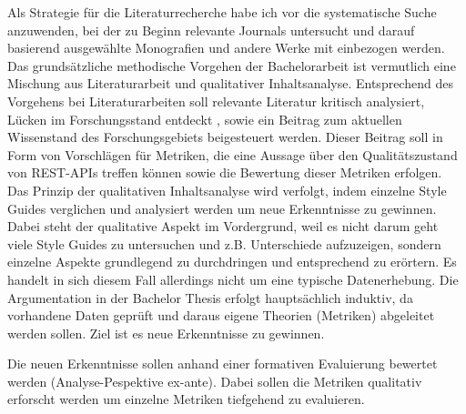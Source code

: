 \documentclass[../../expose]{subfiles}
\begin{document}
Als Strategie für die Literaturrecherche habe ich vor die systematische Suche anzuwenden, bei der zu Beginn relevante Journals untersucht und darauf basierend ausgewählte Monografien und andere Werke mit einbezogen werden.\newline
%
Das grundsätzliche methodische Vorgehen der Bachelorarbeit ist vermutlich eine Mischung aus Literaturarbeit und qualitativer Inhaltsanalyse. Entsprechend des Vorgehens bei Literaturarbeiten soll relevante Literatur kritisch analysiert, Lücken im Forschungsstand entdeckt , sowie ein Beitrag zum aktuellen Wissenstand des Forschungsgebiets beigesteuert werden. Dieser Beitrag soll in Form von Vorschlägen für Metriken, die eine Aussage über den Qualitätszustand von REST-APIs treffen können sowie die Bewertung dieser Metriken erfolgen. Das Prinzip der qualitativen Inhaltsanalyse wird verfolgt, indem einzelne Style Guides verglichen und analysiert werden um neue Erkenntnisse zu gewinnen. Dabei steht der qualitative Aspekt im Vordergrund, weil es nicht darum geht viele Style Guides zu untersuchen und z.B. Unterschiede aufzuzeigen, sondern einzelne Aspekte grundlegend zu durchdringen und entsprechend zu erörtern. Es handelt in sich diesem Fall allerdings nicht um eine typische Datenerhebung.\newline
Die Argumentation in der Bachelor Thesis erfolgt hauptsächlich induktiv, da vorhandene Daten geprüft und daraus eigene Theorien (Metriken) abgeleitet werden sollen. Ziel ist es neue Erkenntnisse zu gewinnen.

Die neuen Erkenntnisse sollen anhand einer formativen Evaluierung bewertet werden (Analyse-Pespektive ex-ante). Dabei sollen die Metriken qualitativ erforscht werden um einzelne Metriken tiefgehend zu evaluieren.
\end{document}
